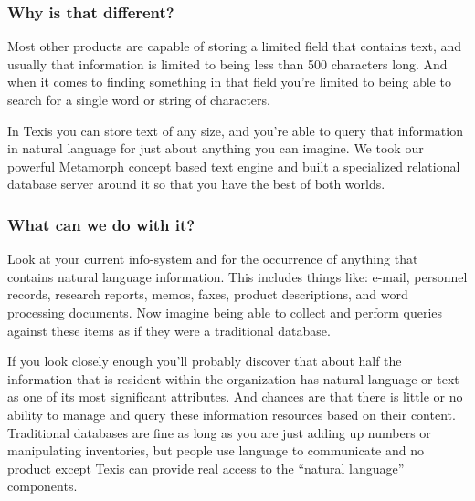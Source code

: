 \subsubsection{Why is that different?}

Most other products are capable of storing a limited field that
contains text, and usually that information is limited to being less
than 500 characters long.  And when it comes to finding something in
that field you're limited to being able to search for a single word or
string of characters.

In Texis you can store text of any size, and you're able to query that
information in natural language for just about anything you can
imagine.  We took our powerful Metamorph concept based text engine and
built a specialized relational database server around it so that you
have the best of both worlds.

\subsubsection{What can we do with it?}

Look at your current info-system and for the occurrence of anything
that contains natural language information.  This includes things
like:  e-mail, personnel records, research reports, memos, faxes,
product descriptions, and word processing documents.  Now imagine
being able to collect and perform queries against these items as if
they were a traditional database.

If you look closely enough you'll probably discover that about half
the information that is resident within the organization has natural
language or text as one of its most significant attributes.  And
chances are that there is little or no ability to manage and query
these information resources based on their content.  Traditional
databases are fine as long as you are just adding up numbers or
manipulating inventories, but people use language to communicate and
no product except Texis can provide real access to the ``natural
language'' components.

